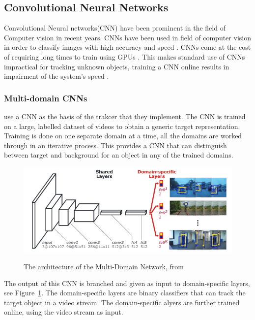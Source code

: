 \subsection{Convolutional Neural Networks}
  Convolutional Neural networks(CNN) have been prominent in the field of Computer vision in recent years.
  CNNs have been used in field of computer vision in order to classify images with high accuracy and speed \cite{razavian2014}.
  CNNs come at the cost of requiring long times to train using GPUs \cite{krizhevsky2012}.
  This makes standard use of CNNs impractical for tracking unknown objects, training a CNN online results in impairment of the system's speed \cite{bertinetto2016}.

  \subsubsection{Multi-domain CNNs}
  \citeauthor{CNNTracking} \cite{CNNTracking} use a CNN as the basis of the trakcer that they implement.
  The CNN is trained on a large, labelled dataset of videos to obtain a generic target representation.
  Training is done on one separate domain at a time, all the domains are worked through in an iterative process.
  This provides a CNN that can distinguish between target and background for an object in any of the trained domains.

  \begin{figure}[!ht]
    \centering
    \includegraphics[scale=0.5]{MDNet.png}
    \label{fig:mdnet}
    \caption{The architecture of the Multi-Domain Network, from \cite{CNNTracking}}
  \end{figure}
  The output of this CNN is branched and given as input to domain-specific layers, see Figure~\ref{fig:mdnet}.
  The domain-specific layers are binary classifiers that can track the target object in a video stream.
  The domain-specific alyers are further trained online, using the video stream as input.

